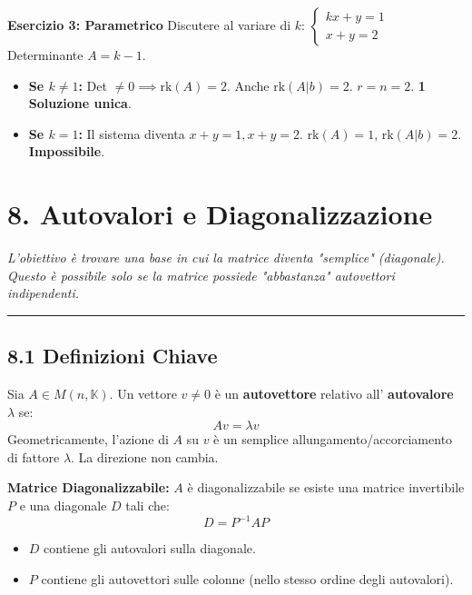 \documentclass[10pt,a4paper]{article}
\begin{document}
\vspace{0.3cm}

\textbf{Esercizio 3: Parametrico}
Discutere al variare di $k$: $\begin{cases} kx + y = 1 \\ x + y = 2 \end{cases}$
\\ Determinante $A = k - 1$.
\begin{itemize}
    \item \textbf{Se $k \neq 1$:} Det $\neq 0 \implies \text{rk}(A)=2$. Anche $\text{rk}(A|b)=2$.
    $r=n=2$. \textbf{1 Soluzione unica}.
    
    \item \textbf{Se $k = 1$:} Il sistema diventa $x+y=1, x+y=2$.
    $\text{rk}(A)=1$, $\text{rk}(A|b)=2$. \textbf{Impossibile}.
\end{itemize}

\section*{8. Autovalori e Diagonalizzazione}
\textit{L'obiettivo è trovare una base in cui la matrice diventa "semplice" (diagonale). Questo è possibile solo se la matrice possiede "abbastanza" autovettori indipendenti.}

\hrule
\vspace{0.4cm}

\subsection*{8.1 Definizioni Chiave}
Sia $A \in M(n, \mathbb{K})$. Un vettore $v \neq 0$ è un \textbf{autovettore} relativo all' \textbf{autovalore} $\lambda$ se:
\[ A v = \lambda v \]
Geometricamente, l'azione di $A$ su $v$ è un semplice allungamento/accorciamento di fattore $\lambda$. La direzione non cambia.

\textbf{Matrice Diagonalizzabile:}
$A$ è diagonalizzabile se esiste una matrice invertibile $P$ e una diagonale $D$ tali che:
\[ D = P^{-1} A P \]
\begin{itemize}
    \item $D$ contiene gli autovalori sulla diagonale.
    \item $P$ contiene gli autovettori sulle colonne (nello stesso ordine degli autovalori).
\end{itemize}

\vspace{0.3cm}
\end{document}
